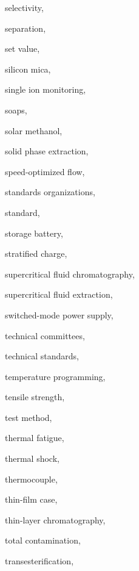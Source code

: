 \begin{theindex}
  \item \lowercase {selectivity}, 
  \item \lowercase {separation}, 
  \item \lowercase {set value}, 
  \item \lowercase {silicon mica}, 
  \item \lowercase {single ion monitoring}, 
  \item \lowercase {soaps}, 
  \item \lowercase {solar methanol}, 
  \item \lowercase {solid phase extraction}, 
  \item \lowercase {speed-optimized flow}, 
  \item \lowercase {standards organizations}, 
  \item \lowercase {standard}, 
  \item \lowercase {storage battery}, 
  \item \lowercase {stratified charge}, 
  \item \lowercase {supercritical fluid chromatography}, 
  \item \lowercase {supercritical fluid extraction}, 
  \item \lowercase {switched-mode power supply}, 
  \item \lowercase {technical committees}, 
  \item \lowercase {technical standards}, 
  \item \lowercase {temperature programming}, 
  \item \lowercase {tensile strength}, 
  \item \lowercase {test method}, 
  \item \lowercase {thermal fatigue}, 
  \item \lowercase {thermal shock}, 
  \item \lowercase {thermocouple}, 
  \item \lowercase {thin-film case}, 
  \item \lowercase {thin-layer chromatography}, 
  \item \lowercase {total contamination}, 
  \item \lowercase {transesterification}, 

\end{theindex}
